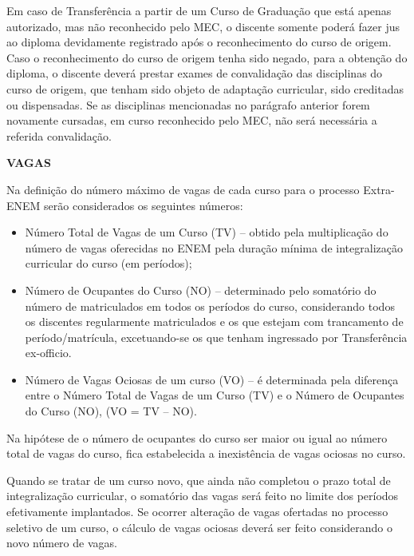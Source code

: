 	Em caso de Transferência a partir de um Curso de Graduação que está apenas autorizado, mas não reconhecido pelo MEC, o discente somente poderá fazer jus ao diploma devidamente registrado após o reconhecimento do curso de origem. Caso o reconhecimento do curso de origem tenha sido negado, para a obtenção do diploma, o discente deverá prestar exames de convalidação das disciplinas do curso de origem, que tenham sido objeto de adaptação curricular, sido creditadas ou dispensadas. Se as disciplinas mencionadas no parágrafo anterior forem novamente cursadas, em curso reconhecido pelo MEC, não será necessária a referida convalidação.

\vspace{4mm}
\textbf{VAGAS}
\vspace{4mm}

	Na definição do número máximo de vagas de cada curso para o processo Extra-ENEM serão considerados os seguintes números:
	\begin{itemize}

		\item Número Total de Vagas de um Curso (TV) – obtido pela multiplicação do número de vagas oferecidas no ENEM pela duração mínima de integralização curricular do curso (em períodos);

		\item Número de Ocupantes do Curso (NO) – determinado pelo somatório do número de matriculados em todos os períodos do curso, considerando todos os discentes regularmente matriculados e os que estejam com trancamento de período/matrícula, excetuando-se os que tenham ingressado por Transferência ex-officio.

		\item Número de Vagas Ociosas de um curso (VO) – é determinada pela diferença entre o Número Total de Vagas de um Curso (TV) e o Número de Ocupantes do Curso (NO), (VO = TV – NO).

	\end{itemize}
	
	Na hipótese de o número de ocupantes do curso ser maior ou igual ao número total de vagas do curso, fica estabelecida a inexistência de vagas ociosas no curso.

	Quando se tratar de um curso novo, que ainda não completou o prazo total de integralização curricular, o somatório das vagas será feito no limite dos períodos efetivamente implantados. Se ocorrer alteração de vagas ofertadas no processo seletivo de um curso, o cálculo de vagas ociosas deverá ser feito considerando o novo número de vagas.

